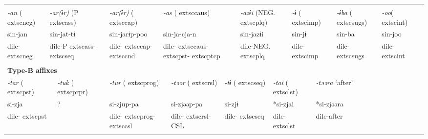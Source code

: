\tabletail{}
\tablelasttail{}
\begin{tabularx}{\textwidth}{XXXXXXXXXXXXXXXXXXXXXX}
\lsptoprule
\multicolumn{22}{X}{{\bfseries Type-A affixes}}\\
{ \textit{{}-an} (	extsc{neg})} & \multicolumn{4}{X}{{ \textit{{}-ar(ɨr)} (P	extsc{ass})}} & \multicolumn{3}{X}{{ \textit{{}-ar(ɨr)} (	extsc{cap})}} & \multicolumn{5}{X}{{ \textit{{}-as} (	extsc{caus})}} & \multicolumn{4}{X}{{ \textit{{}-azɨi} (NEG.	extsc{plq})}} & \multicolumn{2}{X}{{ \textit{{}-ɨ} (	extsc{imp})}} & { \textit{{}-ɨba} (	extsc{sugs})} & { \textit{{}-oo}(	extsc{int})} & \\
{ sin-jan} & \multicolumn{4}{X}{{ sin-jat-tɨ}} & \multicolumn{3}{X}{{ sin-jarɨp-poo}} & \multicolumn{5}{X}{{ sin-ja-cja-n}} & \multicolumn{4}{X}{{ sin-jazɨi}} & \multicolumn{2}{X}{{ sin-jɨ}} & { sin-ba} & { sin-joo} & \\
dile-	extsc{neg} & \multicolumn{4}{X}{dile-P	extsc{ass}-	extsc{seq}} & \multicolumn{3}{X}{dile-	extsc{cap}-	extsc{cnd}} & \multicolumn{5}{X}{dile-	extsc{caus}-	extsc{pst}-	extsc{ptcp}} & \multicolumn{4}{X}{dile-NEG.	extsc{plq}} & \multicolumn{2}{X}{dile-	extsc{imp}} & dile-	extsc{sugs} & dile-	extsc{int} & \\
\multicolumn{22}{X}{}\\
\multicolumn{22}{X}{{\bfseries Type-B affixes}}\\
\multicolumn{2}{X}{{ \textit{{}-tar} (	extsc{pst})}} & \multicolumn{3}{X}{{ \textit{{}-tuk} (	extsc{prpr})}} & \multicolumn{4}{X}{{ \textit{{}-tur} (	extsc{prog})}} & \multicolumn{3}{X}{{ \textit{{}-təər} (	extsc{rsl})}} & \multicolumn{3}{X}{{ \textit{{}-tɨ} (	extsc{seq})}} & \multicolumn{3}{X}{{ \textit{{}-tai} (	extsc{lst})}} & \multicolumn{4}{X}{{ \textit{{}-təəra} ‘after’}}\\
\multicolumn{2}{X}{{ si-zja}} & \multicolumn{3}{X}{{ ?}} & \multicolumn{4}{X}{{ si-zjup-pa}} & \multicolumn{3}{X}{{ si-zjəəp-pa}} & \multicolumn{3}{X}{{ si-zjɨ}} & \multicolumn{3}{X}{{ *si-zjai}} & \multicolumn{4}{X}{{ *si-zjəəra}}\\
\multicolumn{2}{X}{dile-	extsc{pst}} & \multicolumn{3}{X}{} & \multicolumn{4}{X}{dile-	extsc{prog}-	extsc{csl}} & \multicolumn{3}{X}{dile-	extsc{rsl}-CSL} & \multicolumn{3}{X}{dile-	extsc{seq}} & \multicolumn{3}{X}{dile-	extsc{lst}} & \multicolumn{4}{X}{{ dile-after}}\\
\multicolumn{2}{X}{} & \multicolumn{3}{X}{} & \multicolumn{4}{X}{} & \multicolumn{3}{X}{} & \multicolumn{3}{X}{} & \multicolumn{3}{X}{} & \multicolumn{4}{X}{}\\

\end{tabularx}
